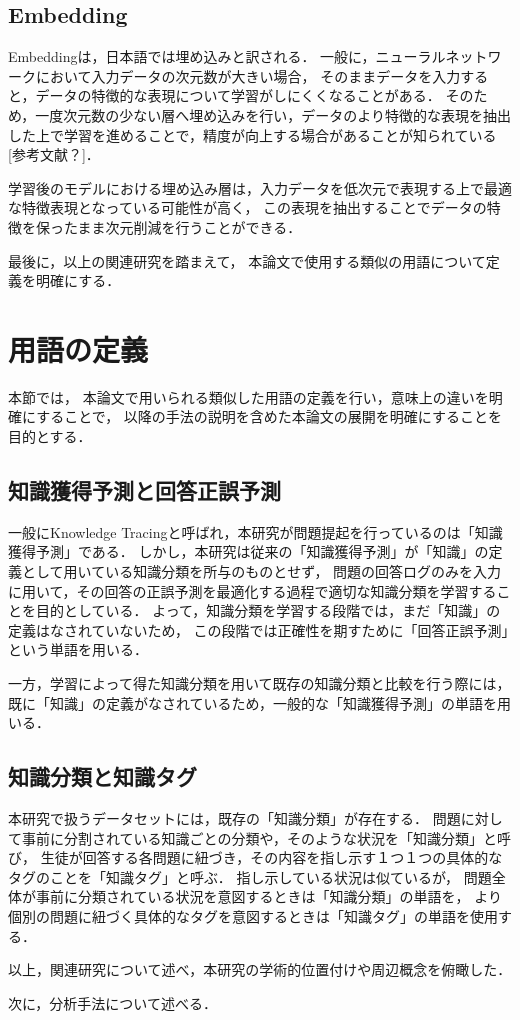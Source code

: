\subsection{Embedding}
Embeddingは，日本語では埋め込みと訳される．
一般に，ニューラルネットワークにおいて入力データの次元数が大きい場合，
そのままデータを入力すると，データの特徴的な表現について学習がしにくくなることがある．
そのため，一度次元数の少ない層へ埋め込みを行い，データのより特徴的な表現を抽出した上で学習を進めることで，精度が向上する場合があることが知られている[参考文献？]．

学習後のモデルにおける埋め込み層は，入力データを低次元で表現する上で最適な特徴表現となっている可能性が高く，
この表現を抽出することでデータの特徴を保ったまま次元削減を行うことができる．


\vvspace


最後に，以上の関連研究を踏まえて，
本論文で使用する類似の用語について定義を明確にする．

\section{用語の定義}
本節では，
本論文で用いられる類似した用語の定義を行い，意味上の違いを明確にすることで，
以降の手法の説明を含めた本論文の展開を明確にすることを目的とする．

\subsection{知識獲得予測と回答正誤予測}
一般にKnowledge Tracingと呼ばれ，本研究が問題提起を行っているのは「知識獲得予測」である．
しかし，本研究は従来の「知識獲得予測」が「知識」の定義として用いている知識分類を所与のものとせず，
問題の回答ログのみを入力に用いて，その回答の正誤予測を最適化する過程で適切な知識分類を学習することを目的としている．
よって，知識分類を学習する段階では，まだ「知識」の定義はなされていないため，
この段階では正確性を期すために「回答正誤予測」という単語を用いる．

一方，学習によって得た知識分類を用いて既存の知識分類と比較を行う際には，
既に「知識」の定義がなされているため，一般的な「知識獲得予測」の単語を用いる．

\subsection{知識分類と知識タグ}
本研究で扱うデータセットには，既存の「知識分類」が存在する．
問題に対して事前に分割されている知識ごとの分類や，そのような状況を「知識分類」と呼び，
生徒が回答する各問題に紐づき，その内容を指し示す１つ１つの具体的なタグのことを「知識タグ」と呼ぶ．
指し示している状況は似ているが，
問題全体が事前に分類されている状況を意図するときは「知識分類」の単語を，
より個別の問題に紐づく具体的なタグを意図するときは「知識タグ」の単語を使用する．



以上，関連研究について述べ，本研究の学術的位置付けや周辺概念を俯瞰した．

次に，分析手法について述べる．




